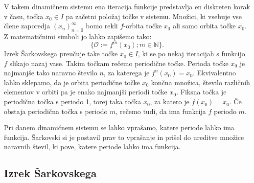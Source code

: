 \documentclass[mat2]{fmfdelo}
\newcommand{\N}{\mathbb N}
\begin{document}
V takem dinamičnem sistemu ena iteracija funkcije predstavlja en diskreten korak v času, točka $x_0 \in I$ pa začetni položaj točke v sistemu. Množici, ki vsebuje vse člene zaporedja $\left( x_n \right)_{n=0}^{\infty}$ bomo rekli $f$-orbita točke $x_0$ ali samo orbita točke $x_0$. Z matematičnimi simboli jo lahko zapišemo tako:
$$\{ \mathcal{O} := f^m(x_0) ; m \in \N \}.$$
Izrek Šarkovskega preučuje take točke $x_0 \in I$, ki se po nekaj iteracijah s funkcijo $f$ slikajo nazaj vase. Takim točkam rečemo periodične točke. Perioda točke $x_0$ je najmanjše tako naravno število $n$, za katerega je $f^n(x_0) = x_0$. Ekvivalentno lahko sklepamo, da je orbita periodične točke $x_0$ končna množica, število različnih elementov v orbiti pa je enako najmanjši periodi točke $x_0$. Fiksna točka je periodična točka s periodo 1, torej taka točka $x_0$, za katero je $f(x_0) = x_0$. Če obstaja periodična točka s periodo $m$, rečemo tudi, da ima funkcija $f$ periodo $m$.

Pri danem dinamičnem sistemu se lahko vprašamo, katere periode lahko ima funkcija. Šarkovski si je postavil prav to vprašanje in prišel do ureditve množice naravnih števil, ki pove, katere periode lahko ima funkcija.

\subsection{Izrek Šarkovskega}
\end{document}
